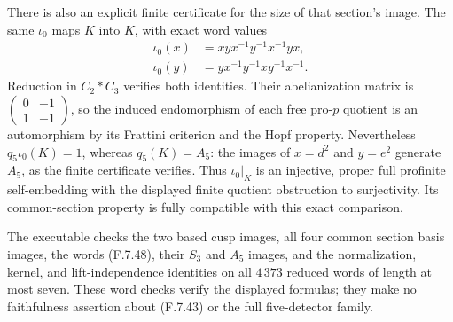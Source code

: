 There is also an explicit finite certificate for
the size of that section's image.  The same
$\iota_0$ maps $K$ into $K$, with exact word values
\[
 \begin{split}
 \iota_0(x)&=xyx^{-1}y^{-1}x^{-1}yx,\\
 \iota_0(y)&=yx^{-1}y^{-1}xy^{-1}x^{-1}.
 \end{split}                                                   \tag{F.7.48}
\]
Reduction in $C_2*C_3$ verifies both identities.
Their abelianization matrix is
$\left(\begin{smallmatrix}0&-1\\1&-1\end{smallmatrix}\right)$,
so the induced endomorphism of each free pro-$p$
quotient is an automorphism by its Frattini
criterion and the Hopf property.  Nevertheless
$q_5\iota_0(K)=1$, whereas $q_5(K)=A_5$:
the images of $x=d^2$ and $y=e^2$ generate $A_5$,
as the finite certificate verifies.
Thus $\iota_0|_K$ is an injective, proper full
profinite self-embedding with the displayed
finite quotient obstruction to surjectivity.
Its common-section property is fully compatible
with this exact comparison.

The executable
checks the two based cusp images, all four common
section basis images, the words (F.7.48), their
$S_3$ and $A_5$ images, and the normalization,
kernel, and lift-independence identities on all
$4\,373$ reduced words of length at most seven.
These word checks verify the displayed formulas;
they make no faithfulness assertion about
(F.7.43) or the full five-detector family.
